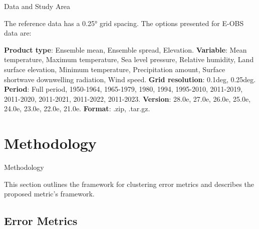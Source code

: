 \documentclass[xcolor={dvipsnames}]{beamer}
\begin{document}
\begin{frame}{Data and Study Area}

The reference data has a 0.25° grid spacing. The options presented for E-OBS data are:

\hfill

\textbf{Product type}: Ensemble mean, Ensemble spread, Elevation. \newline
\textbf{Variable}: Mean temperature, Maximum temperature, Sea level pressure, Relative humidity, Land surface elevation, Minimum temperature, Precipitation amount, Surface shortwave downwelling radiation, Wind speed. \newline
\textbf{Grid resolution}: 0.1deg, 0.25deg. \newline
\textbf{Period}: Full period, 1950-1964, 1965-1979, 1980, 1994, 1995-2010, 2011-2019, 2011-2020, 2011-2021, 2011-2022, 2011-2023. \newline
\textbf{Version}: 28.0e, 27.0e, 26.0e, 25.0e, 24.0e, 23.0e, 22.0e, 21.0e. \newline
\textbf{Format}: .zip, .tar.gz.
 
\end{frame}

\section{Methodology}

\begin{frame}{Methodology}

This section outlines the framework for clustering error metrics and describes the proposed metric's framework.
    
\end{frame}

\subsection{Error Metrics}
\end{document}
